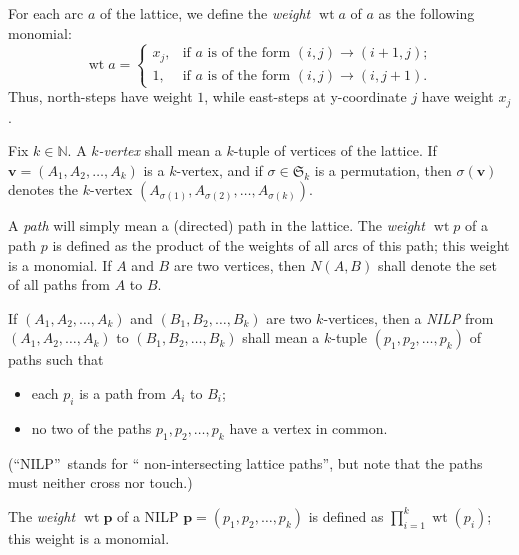 \documentclass[reqno]{amsart}%
\newcommand{\0}{\phantom{c}}
\let\prodnonlimits\prod
\renewcommand{\prod}{\prodnonlimits\limits}
\newcommand{\defn}[1]{{\color{darkred}\emph{#1}}}
\theoremstyle{plain}
\theoremstyle{definition}
\numberwithin{equation}{section}
\begin{document}
For each arc $a$ of the lattice, we define the
\defn{weight $\operatorname{wt}a$} of $a$ as the following monomial:%
\[
\operatorname*{wt}a=%
\begin{cases}
x_{j}, & \text{if }a\text{ is of the form }\left(  i,j\right)  \rightarrow
\left(  i+1,j\right)  ;\\
1, & \text{if }a\text{ is of the form }\left(  i,j\right)  \rightarrow\left(
i,j+1\right)  .
\end{cases}
\]
Thus, north-steps have weight $1$, while east-steps at y-coordinate $j$ have
weight $x_{j}$.

Fix $k\in\mathbb{N}$. A \defn{$k$-vertex} shall mean a $k$-tuple of vertices
of the lattice. If $\mathbf{v}=\left(  A_{1},A_{2},\ldots,A_{k}\right)  $ is a
$k$-vertex, and if $\sigma\in\mathfrak{S}_{k}$ is a permutation, then
$\sigma\left(  \mathbf{v}\right)  $ denotes the $k$-vertex $\left(
A_{\sigma\left(  1\right)  },A_{\sigma\left(  2\right)  },\ldots
,A_{\sigma\left(  k\right)  }\right)  $.

A \defn{path} will simply mean a (directed) path in the lattice. The
\defn{weight $\operatorname{wt}p$} of a path $p$ is defined as the product of
the weights of all arcs of this path; this weight is a monomial. If $A$ and
$B$ are two vertices, then \defn{$N\left(  A,B\right)$} shall denote the set
of all paths from $A$ to $B$.

If $\left(  A_{1},A_{2},\ldots,A_{k}\right)  $ and $\left(  B_{1},B_{2}%
,\ldots,B_{k}\right)  $ are two $k$-vertices, then a \defn{NILP} from $\left(
A_{1},A_{2},\ldots,A_{k}\right)  $ to $\left(  B_{1},B_{2},\ldots
,B_{k}\right)  $ shall mean a $k$-tuple $\left(  p_{1},p_{2},\ldots
,p_{k}\right)  $ of paths such that

\begin{itemize}
\item each $p_{i}$ is a path from $A_{i}$ to $B_{i}$;

\item no two of the paths $p_{1},p_{2},\ldots,p_{k}$ have a vertex in common.
\end{itemize}

(\textquotedblleft NILP\textquotedblright\ stands for \textquotedblleft
non-intersecting lattice paths\textquotedblright, but note that the paths must
neither cross nor touch.)

The \defn{weight $\operatorname{wt}\mathbf{p}$} of a NILP $\mathbf{p}=\left(
p_{1},p_{2},\ldots,p_{k}\right)  $ is defined as $\prod_{i=1}^{k}%
\operatorname*{wt}\left(  p_{i}\right)  $; this weight is a monomial.
\end{document}
